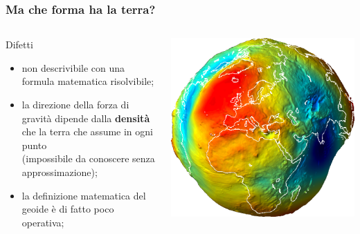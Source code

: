 \documentclass{beamer}
\begin{document}
{\begin{frame}
\begin{columns}
    \end{columns}

\end{frame}

\begin{frame}
    \frametitle{Ma che forma ha la terra?}

    \begin{columns}
        \begin{column}{0.5\textwidth}
            \begin{block}{Difetti}
                {\small \begin{itemize}
                    \item[\danger] non descrivibile con una formula matematica risolvibile;
                    \item[\danger] la direzione della forza di gravità dipende dalla \textbf{densità}
                        che la terra che assume in ogni punto\\
                        (impossibile da conoscere senza approssimazione);
                    \item[\danger] la definizione matematica del geoide è di fatto poco operativa;
                \end{itemize}}
           \end{block}
        \end{column}
        \begin{column}{0.5\textwidth}
            \begin{center}
        		\includegraphics[width=\textwidth] {./pics/geoide.png}	
        	\end{center} 
        \end{column}
        

\end{columns}
\end{frame}}
\end{document}
